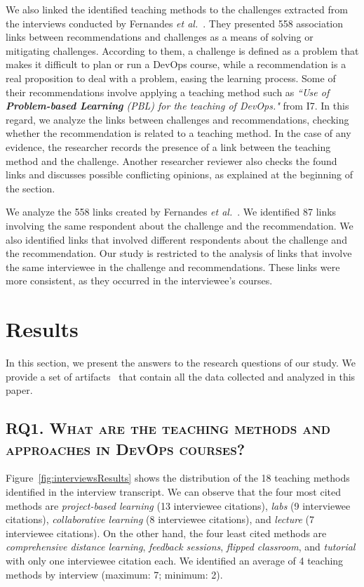 \documentclass[10pt,conference]{IEEEtran}
\begin{document}
We also linked the identified teaching methods to the challenges extracted from the interviews conducted by Fernandes \textit{et al.}~\cite{fernandes:2022}. They presented 558 association links between recommendations and challenges as a means of solving or mitigating challenges. According to them, a challenge is defined as a problem that makes it difficult to plan or run a DevOps course, while a recommendation is a real proposition to deal with a problem, easing the learning process. Some of their recommendations involve applying a teaching method such as \textit{``Use of \textbf{Problem-based Learning} (PBL) for the teaching of DevOps."} from I7. In this regard, we analyze the links between challenges and recommendations,  checking whether the recommendation is related to a teaching method.  In the case of any evidence, the researcher records the presence of a link between the teaching method and the challenge. Another researcher reviewer also checks the found links and discusses possible conflicting opinions, as explained at the beginning of the section.


We analyze the 558 links created by Fernandes \textit{et al.}~\cite{fernandes:2022}. We identified 87 links involving the same respondent about the challenge and the recommendation. We also identified links that involved different respondents about the challenge and the recommendation. Our study is restricted to the analysis of links that involve the same interviewee in the challenge and recommendations. These links were more consistent, as they occurred in the interviewee’s courses.



\section{Results}  \label{sec:results}

In this section, we present the answers to the research questions of our study.  We provide a set of artifacts~\cite{researchArtifact} that contain all the data collected and analyzed in this paper.


\subsection{RQ1. \textsc{What are the teaching methods and approaches in DevOps courses?}}


Figure~\ref{fig:interviewsResults} shows the distribution of the 18 teaching methods identified in the interview transcript. We can observe that the four most cited methods are \textsl{project-based learning} (13 interviewee citations), \textsl{labs} (9 interviewee citations), \textsl{collaborative learning} (8 interviewee citations), and \textsl{lecture} (7 interviewee citations). On the other hand, the four least cited methods are \textsl{comprehensive distance learning}, \textsl{feedback sessions}, \textsl{flipped classroom}, and \textsl{tutorial} with only one interviewee citation each. We identified an average of 4 teaching methods by interview (maximum: 7; minimum: 2).
 
\end{document}
